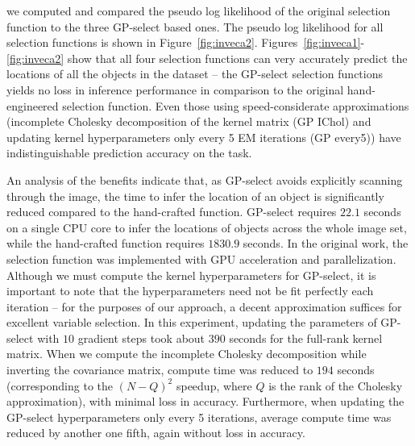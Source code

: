 %
we computed and compared the pseudo log likelihood \citep{DaiEtAl2013} of the original selection function to the three GP-select based ones.
% 
The pseudo log likelihood for all selection functions is shown in Figure~\ref{fig:inveca2}.
Figures~\ref{fig:inveca1}-\ref{fig:inveca2} show that all four selection functions can very accurately predict the locations of all the objects in the dataset -- 
the GP-select selection functions yields no loss in inference performance in comparison to the original hand-engineered selection function. 
Even those using speed-considerate approximations (incomplete Cholesky decomposition of the kernel matrix (GP IChol) and updating kernel hyperparameters only every 5 EM iterations (GP every5)) have indistinguishable prediction accuracy on the task.


An analysis of the benefits indicate that, as GP-select avoids explicitly scanning through the image, the time to infer the location of an object is significantly reduced compared to the hand-crafted function. GP-select requires $22.1$ seconds on a single CPU core to infer the locations of objects across the whole image set, while the hand-crafted function requires $1830.9$ seconds. In the original work, the selection function was implemented with GPU acceleration and parallelization. 
Although we must compute the kernel hyperparameters for GP-select, 
it is important to note that the hyperparameters need not be fit perfectly each iteration -- for the purposes of our approach, a decent approximation suffices for excellent variable selection. 
 In this experiment, updating the parameters of GP-select with $10$ gradient steps took about $390$ seconds for the full-rank kernel matrix. 
When we compute the incomplete Cholesky decomposition while inverting the covariance matrix, compute time was reduced to $194$ seconds (corresponding to the $(N-Q)^2$ speedup, where $Q$ is the rank of the Cholesky approximation), with minimal loss in accuracy.
Furthermore, when updating the GP-select hyperparameters only every 5 iterations, average compute time was reduced by another one fifth, again without loss in accuracy.



